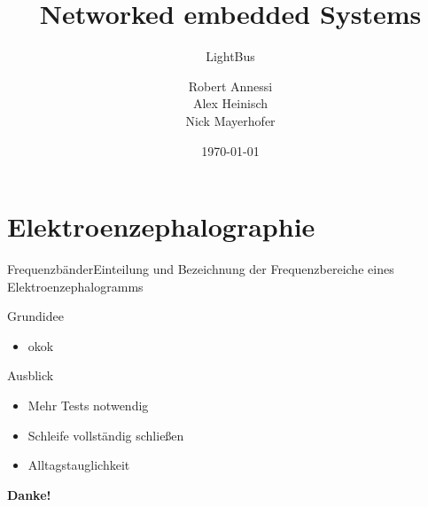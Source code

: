 \documentclass[hyperref={pdfpagelabels=false}]{beamer}
\title {Networked embedded Systems}
\subtitle {LightBus}
\author{Robert Annessi\\ Alex Heinisch\\ Nick Mayerhofer}
\date{\customdate\today}
\begin{document}
\begin{frame}
  \titlepage
\end{frame}
 \logo{}



\section{Elektroenzephalographie}
\begin{frame}{Frequenzbänder}{Einteilung und Bezeichnung der Frequenzbereiche eines Elektroenzephalogramms}
\begin{center}
\end{center}
\end{frame}


\begin{frame}{Grundidee}
  \begin{itemize}
  \item \begin{large}okok\end{large}
  \end{itemize}
\end{frame}

\begin{frame}{Ausblick}
\begin{itemize}
 \item \begin{large}Mehr Tests notwendig\end{large}
 \item \begin{large}Schleife vollständig schließen\end{large}
 \item \begin{large}Alltagstauglichkeit\end{large}
\end{itemize}
\vspace{1cm}
\end{frame}

\begin{frame}
\begin{center}
\begin{Huge}\textbf{Danke!}\end{Huge}
\end{center}
\end{frame}
\end{document}
